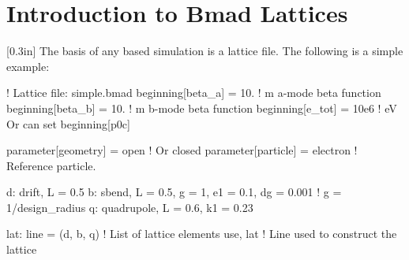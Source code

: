 \documentclass{hitec}     %
\newcommand{\Section}[1]{\section{#1}\vspace*{-1ex}}
\begin{document}
\newpage

\Section{Introduction to Bmad Lattices}
\label{s:bmad.intro}

[0.3in]
%
The basis of any \bmad based simulation is a lattice file. The following is a
simple example:
\begin{code}
! Lattice file: simple.bmad
beginning[beta_a] = 10.   ! m  a-mode beta function
beginning[beta_b] = 10.   ! m  b-mode beta function
beginning[e_tot] = 10e6   ! eV   Or can set beginning[p0c]

parameter[geometry] = open          ! Or closed
parameter[particle] = electron      ! Reference particle.

d: drift, L = 0.5
b: sbend, L = 0.5, g = 1, e1 = 0.1, dg = 0.001   ! g = 1/design_radius
q: quadrupole, L = 0.6, k1 = 0.23

lat: line = (d, b, q)       ! List of lattice elements
use, lat                    ! Line used to construct the lattice
\end{code}
\end{document}
